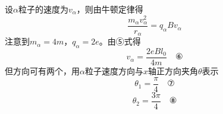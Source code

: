 \documentclass[\gkver]{gaokaozhenti}
\begin{document}
\begin{enumerate}
{设$\alpha$粒子的速度为$v_{\alpha}$，则由牛顿定律得
\[ \frac{m_{\alpha}v_{\alpha}^{2}}{r_{\alpha}}=q_{\alpha}Bv_{\alpha} \]
注意到$m_{\alpha}=4m$，$q_{\alpha}=2e$。由⑤式得
\[ v_{\alpha}=\frac{2eBl_{0}}{4m} \quad \text{⑥} \]
但方向可有两个，用$\alpha$粒子速度方向与$x$轴正方向夹角$\theta$表示
\[ \theta_{1}=\frac{\pi}{4} \quad \text{⑦} \]
\[ \theta_{2}=\frac{3\pi}{4} \quad \text{⑧} \]
}

\end{enumerate}
\end{document}
